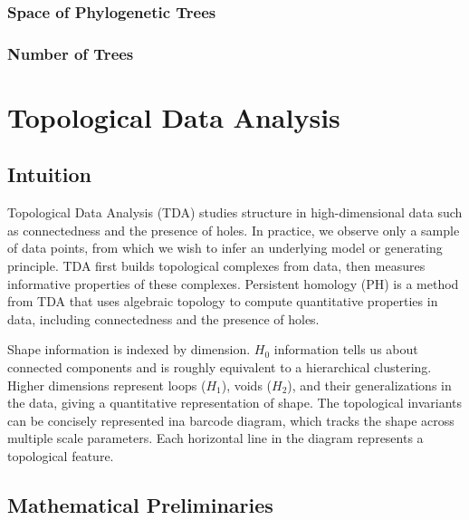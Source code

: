\subsubsection{Space of Phylogenetic Trees}

\subsubsection{Number of Trees}


\section{Topological Data Analysis}
\label{background:sec:tda}

\subsection{Intuition}

Topological Data Analysis (TDA) studies structure in high-dimensional data such as connectedness and the presence of holes.
In practice, we observe only a sample of data points, from which we wish to infer an underlying model or generating principle.
TDA first builds topological complexes from data, then measures informative properties of these complexes. 
Persistent homology (PH) is a method from TDA that uses algebraic topology to compute quantitative properties in data, including connectedness and the presence of holes.

Shape information is indexed by dimension.
$H_0$ information tells us about connected components and is roughly equivalent to a hierarchical clustering.
Higher dimensions represent loops ($H_1$), voids ($H_2$), and their generalizations in the data, giving a quantitative representation of shape.
The topological invariants can be concisely represented ina barcode diagram, which tracks the shape across multiple scale parameters.
Each horizontal line in the diagram represents a topological feature.


\subsection{Mathematical Preliminaries}

